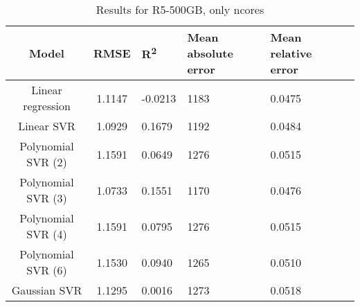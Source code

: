 \begin{table}[H]
\centering
\begin{adjustbox}{center}
\begin{tabular}{c | c M{1.2cm} M{2.5cm} M{2.5cm} M{1.8cm}}
Model & RMSE & R\textsuperscript{2} & Mean absolute error & Mean relative error \tabularnewline
\hline
Linear regression & 1.1147 & -0.0213 &   1183 & 0.0475 \\
Linear SVR & 1.0929 & 0.1679 &   1192 & 0.0484 \\
Polynomial SVR (2) & 1.1591 & 0.0649 &   1276 & 0.0515 \\
Polynomial SVR (3) & 1.0733 & 0.1551 &   1170 & 0.0476 \\
Polynomial SVR (4) & 1.1591 & 0.0795 &   1276 & 0.0515 \\
Polynomial SVR (6) & 1.1530 & 0.0940 &   1265 & 0.0510 \\
Gaussian SVR & 1.1295 & 0.0016 &   1273 & 0.0518 \\
\end{tabular}
\end{adjustbox}
\\
\caption{Results for R5-500GB, only ncores}
\label{tab:only_1_linear_R5_500}
\end{table}

